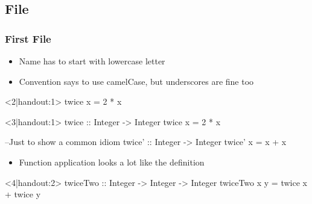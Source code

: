 \subsection{File}
\begin{frame}[t,fragile]
    \frametitle{First File}
    \begin{overprint}


        \begin{itemize}
            \item<2-3|handout:1> Name has to start with lowercase letter
            \item<2-3|handout:1> Convention says to use camelCase, but underscores are fine too
        \end{itemize}

        \begin{hscode}<2|handout:1>
            twice x = 2 * x
        \end{hscode}

        \begin{hscode}<3|handout:1>
            twice :: Integer -> Integer
            twice x = 2 * x

            --Just to show a common idiom
            twice' :: Integer -> Integer
            twice' x = x + x
        \end{hscode}

        \begin{itemize}
            \item<4|handout:2> Function application looks a lot like the definition
        \end{itemize}
        \begin{hscode}<4|handout:2>
            twiceTwo :: Integer -> Integer -> Integer
            twiceTwo x y = twice x + twice y
        \end{hscode}
    \end{overprint}
\end{frame}

